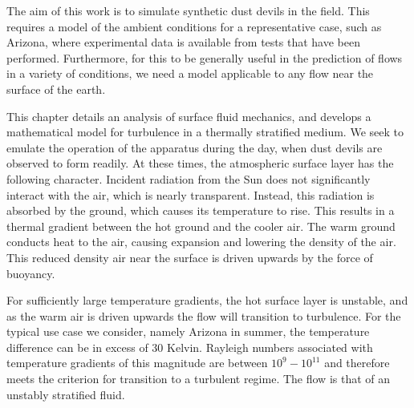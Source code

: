 \label{sec:mathmodel}


%
%

The aim of this work is to simulate synthetic
dust devils in the field. This requires a model of the ambient
conditions for a representative case, such as Arizona, where
experimental data is available from tests that have been
performed. Furthermore, for this to be generally useful in the
prediction of flows in a variety of conditions, we need a model
applicable to any flow near the surface of the earth.  

This chapter details an analysis of surface fluid mechanics, and
develops a mathematical model for turbulence in a thermally stratified
medium. We seek to emulate the operation of the apparatus during the
day, when dust devils are observed to form readily. 
At these times, the atmospheric surface layer has the following
character. Incident radiation from the Sun does not significantly
interact with the air, which is nearly
transparent\cite{haltiner1957dynamical}. Instead, this radiation is
absorbed by the ground, which causes its temperature to rise. This
results in a thermal gradient between the hot ground and the cooler
air. The warm ground conducts heat to the air, causing expansion and
lowering the density of the air. This reduced density air near the
surface is driven upwards by the force of buoyancy.   

For sufficiently large temperature gradients, the hot surface layer is
unstable, and as the warm air is driven upwards the flow will transition
to turbulence. For the typical use case we consider, namely Arizona in
summer, the temperature difference can be in excess of 30 Kelvin. 
Rayleigh numbers associated with temperature gradients of this magnitude
are between $10^{9} - 10^{11}$ and therefore meets the
criterion\cite{incropera1996fundamentals}  
for transition to a turbulent regime. The flow is that of an unstably
stratified fluid.  

